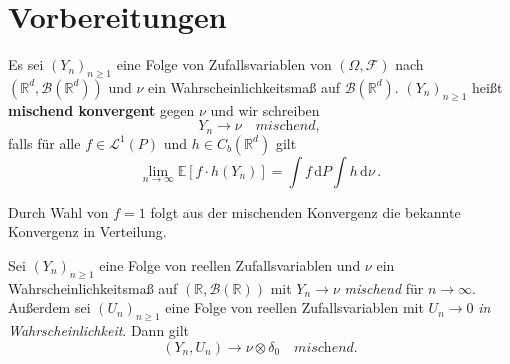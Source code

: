 \documentclass[ngerman,a4paper,11pt]{scrartcl}
\newcommand{\EE}{\mathbb{E}}
\newcommand{\RR}{\mathbb{R}}
\newcommand{\bb}{\mathcal{B}}
\newcommand{\ff}{\mathcal{F}}
\renewcommand{\ll}{\mathcal{L}}
\newcommand{\Cb}[1]{C_b(#1)}
\newcommand{\expect}[1]{\EE[#1]}
\newcommand{\dvar}[1]{\,\mathrm{d}#1}
\begin{document}
\section{Vorbereitungen}
\begin{defn}
  Es sei $(Y_n)_{n\geq 1}$ eine Folge von Zufallsvariablen von $(\Omega, \ff)$
  nach $(\RR^d, \bb(\RR^d))$ und $\nu$ ein Wahrscheinlichkeitsmaß auf
  $\bb(\RR^d)$. $(Y_n)_{n\geq 1}$ heißt \textbf{mischend konvergent} gegen $\nu$
  und wir schreiben
  \begin{equation*}
    Y_n\longrightarrow\nu \quad\textit{mischend}, 
  \end{equation*}
  falls für alle $f\in\ll^1(P)$ und $h\in\Cb{\RR^d}$ gilt
  \begin{equation*}
   \lim_{n\to\infty} \expect{f\cdot h(Y_n)} = \int f\dvar{P}\int h\dvar{\nu}\,.
  \end{equation*}
\end{defn}
\begin{rem}
 Durch Wahl von $f=1$ folgt aus der mischenden Konvergenz die bekannte
 Konvergenz in Verteilung. 
\end{rem}
\begin{lem}\label{lem:misch}
  Sei $(Y_n)_{n\geq 1}$ eine Folge von reellen Zufallsvariablen und $\nu$ ein
  Wahrscheinlichkeitsmaß auf $(\RR,\bb(\RR))$ mit $Y_n\to\nu$ \textit{mischend}
  für $n\to\infty$. Außerdem sei $(U_n)_{n\geq 1}$ eine Folge von reellen
  Zufallsvariablen mit $U_n\to 0$ \textit{in Wahrscheinlichkeit}. Dann gilt
\begin{equation*}
 (Y_n,U_n)\to\nu\otimes\delta_0\quad\textit{mischend.}
\end{equation*}
\end{lem}
\end{document}
